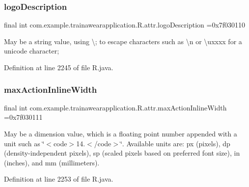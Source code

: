 \subsubsection{\texorpdfstring{logoDescription}{logoDescription}}
{\footnotesize\ttfamily final int com.\+example.\+trainawearapplication.\+R.\+attr.\+logo\+Description =0x7f030110\hspace{0.3cm}{\ttfamily [static]}}

May be a string value, using \textquotesingle{}\textbackslash{};\textquotesingle{} to escape characters such as \textquotesingle{}\textbackslash{}n\textquotesingle{} or \textquotesingle{}\textbackslash{}uxxxx\textquotesingle{} for a unicode character; 

Definition at line 2245 of file R.\+java.

\mbox{\label{classcom_1_1example_1_1trainawearapplication_1_1_r_1_1attr_a388991765c2fff242ef4ce3213ed5bf0}} 
\subsubsection{\texorpdfstring{maxActionInlineWidth}{maxActionInlineWidth}}
{\footnotesize\ttfamily final int com.\+example.\+trainawearapplication.\+R.\+attr.\+max\+Action\+Inline\+Width =0x7f030111\hspace{0.3cm}{\ttfamily [static]}}

May be a dimension value, which is a floating point number appended with a unit such as \char`\"{}$<$code$>$14.\+5sp$<$/code$>$\char`\"{}. Available units are\+: px (pixels), dp (density-\/independent pixels), sp (scaled pixels based on preferred font size), in (inches), and mm (millimeters). 

Definition at line 2253 of file R.\+java.

\mbox{\label{classcom_1_1example_1_1trainawearapplication_1_1_r_1_1attr_a4c5e02e478aa92c377c59300cb3fe42e}} 
